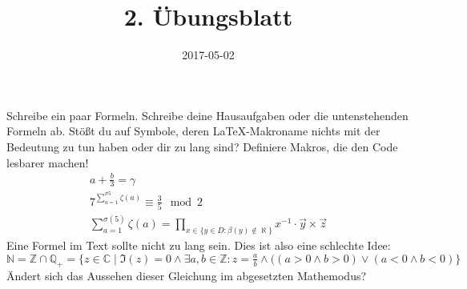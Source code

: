 \documentclass{latex-htw-uebung}
\title{2. Übungsblatt}
\date{2017-05-02}
\newcommand{\naturals}{\mathbb{N}}
\newcommand{\integers}{\mathbb{Z}}
\newcommand{\rationals}{\mathbb{Q}}
\newcommand{\logand}{\wedge}
\newcommand{\logor}{\vee}
\newcommand{\complex}{\mathbb{C}}
\begin{document}
Schreibe ein paar Formeln. Schreibe deine Hausaufgaben oder die untenstehenden Formeln ab. 
Stößt du auf Symbole, deren \LaTeX-Makroname nichts mit der Bedeutung zu tun haben oder dir zu lang sind? Definiere Makros, die den Code lesbarer machen!
\begin{align}
  a + \frac {b}{3} = \gamma \\
  7^{\sum_{a = 1}^{\sigma{5}} \zeta(a)} \equiv \frac 35 \mod 2 \\
  \sum_{a = 1}^{\sigma(5)} \zeta(a) = \prod_{x \in \{y \in D : \beta(y) \notin \aleph\}} x^{-1} \cdot \vec {y} \times \vec {z}
\end{align}
Eine Formel im Text sollte nicht zu lang sein. Dies ist also eine schlechte Idee: $
  \naturals = \integers \cap \rationals_{+}  = \{z \in \complex \mid \Im (z) = 0 \logand
    \exists a, b \in \integers: z = \frac ab \logand
    ((a > 0 \logand b > 0) \logor (a < 0 \logand b < 0)\}$
Ändert sich das Aussehen dieser Gleichung im abgesetzten Mathemodus?
\end{document}
